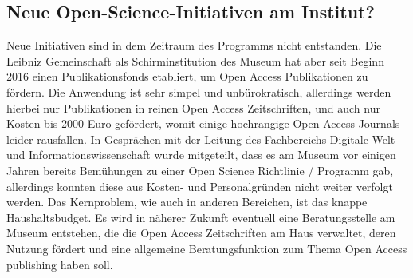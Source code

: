 \documentclass[11pt,a4paper]{article}
\begin{document}
\subsection{Neue Open-Science-Initiativen am Institut?}
Neue Initiativen sind in dem Zeitraum des Programms nicht entstanden. Die Leibniz Gemeinschaft als Schirminstitution des Museum hat aber seit Beginn 2016 einen Publikationsfonds etabliert, um Open Access Publikationen zu fördern. Die Anwendung ist sehr simpel und unbürokratisch, allerdings werden hierbei nur Publikationen in reinen Open Access Zeitschriften, und auch nur Kosten bis 2000 Euro gefördert, womit einige hochrangige Open Access Journals leider rausfallen.
In Gesprächen mit der Leitung des Fachbereichs Digitale Welt und Informationswissenschaft wurde mitgeteilt, dass es am Museum vor einigen Jahren bereits Bemühungen zu einer Open Science Richtlinie / Programm gab, allerdings konnten diese aus Kosten- und Personalgründen nicht weiter verfolgt werden. Das Kernproblem, wie auch in anderen Bereichen, ist das knappe Haushaltsbudget. Es wird in näherer Zukunft eventuell eine Beratungsstelle am Museum entstehen, die die Open Access Zeitschriften am Haus verwaltet, deren Nutzung fördert und eine allgemeine Beratungsfunktion zum Thema Open Access publishing haben soll.
\end{document}
